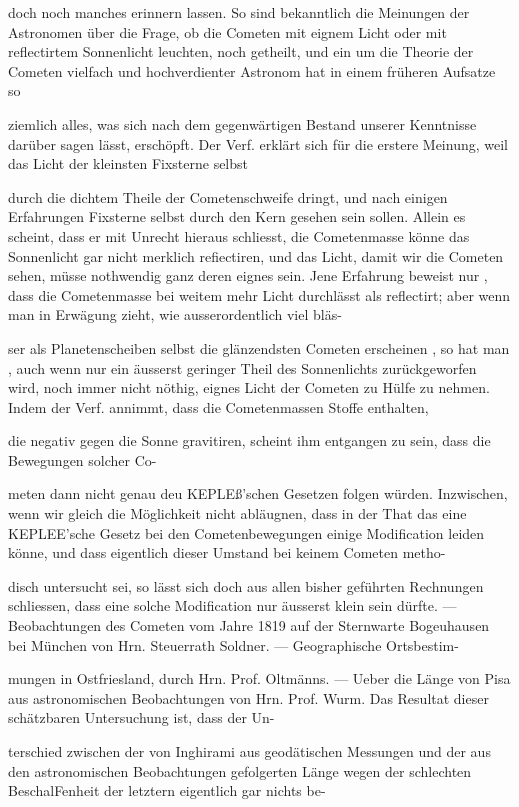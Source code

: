 \documentclass[10pt,a4paper]{article}
\begin{document}
doch noch manches erinnern lassen. So sind bekanntlich die Meinungen der Astronomen über die Frage, ob die Cometen mit eignem Licht oder mit reflectirtem Sonnenlicht leuchten, noch getheilt, und ein um die Theorie der Cometen vielfach und hochverdienter Astronom hat in einem früheren Aufsatze so

ziemlich alles, was sich nach dem gegenwärtigen Bestand unserer Kenntnisse darüber sagen lässt, erschöpft. Der Verf. erklärt sich für die erstere Meinung, weil das Licht der kleinsten Fixsterne selbst

durch die dichtem Theile der Cometenschweife dringt, und nach einigen Erfahrungen Fixsterne selbst durch den Kern gesehen sein sollen. Allein es scheint, dass er mit Unrecht hieraus schliesst, die Cometenmasse könne das Sonnenlicht gar nicht merklich refiectiren, und das Licht, damit wir die Cometen sehen, müsse nothwendig ganz deren eignes sein. Jene Erfahrung beweist nur , dass die Cometenmasse bei weitem mehr Licht durchlässt als reflectirt; aber wenn man in Erwägung zieht, wie ausserordentlich viel bläs-

ser als Planetenscheiben selbst die glänzendsten Cometen erscheinen , so hat man , auch wenn nur ein äusserst geringer Theil des Sonnenlichts zurückgeworfen wird, noch immer nicht nöthig, eignes Licht der Cometen zu Hülfe zu nehmen. Indem der Verf. annimmt, dass die Cometenmassen Stoffe enthalten,

die negativ gegen die Sonne gravitiren, scheint ihm entgangen zu sein, dass die Bewegungen solcher Co-

meten dann nicht genau deu KEPLEß'schen Gesetzen folgen würden. Inzwischen, wenn wir gleich die Möglichkeit nicht abläugnen, dass in der That das eine KEPLEE'sche Gesetz bei den Cometenbewegungen einige Modification leiden könne, und dass eigentlich dieser Umstand bei keinem Cometen metho-

disch untersucht sei, so lässt sich doch aus allen bisher geführten Rechnungen schliessen, dass eine solche Modification nur äusserst klein sein dürfte. — Beobachtungen des Cometen vom Jahre 1819 auf der Sternwarte Bogeuhausen bei München von Hrn. Steuerrath Soldner. — Geographische Ortsbestim-

mungen in Ostfriesland, durch Hrn. Prof. Oltmänns. — Ueber die Länge von Pisa aus astronomischen Beobachtungen von Hrn. Prof. Wurm. Das Resultat dieser schätzbaren Untersuchung ist, dass der Un-

terschied zwischen der von Inghirami aus geodätischen Messungen und der aus den astronomischen Beobachtungen gefolgerten Länge wegen der schlechten BeschalFenheit der letztern eigentlich gar nichts be-
\end{document}
